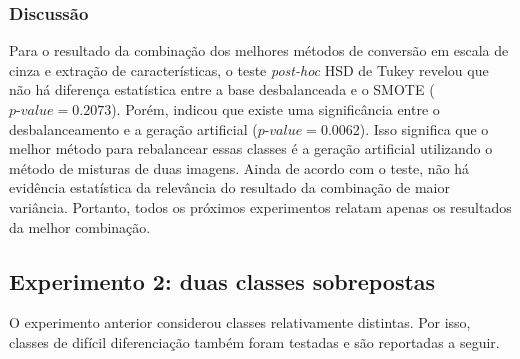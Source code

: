 \FloatBarrier
\subsubsection{Discussão}


Para o resultado da combinação dos melhores métodos de conversão em escala de cinza e extração de características, o teste \textit{post-hoc} HSD de Tukey revelou que não há diferença estatística entre a base desbalanceada e o SMOTE ($\textit{p-value} = 0.2073$). Porém, indicou que existe uma significância entre o desbalanceamento e a geração artificial ($\textit{p-value} = 0.0062$). Isso significa que o melhor método para rebalancear essas classes é a geração artificial utilizando o método de misturas de duas imagens. Ainda de acordo com o teste, não há evidência estatística da relevância do resultado da combinação de maior variância. Portanto, todos os próximos experimentos relatam apenas os resultados da melhor combinação.

\subsection{Experimento 2: duas classes sobrepostas}

O experimento anterior considerou classes relativamente distintas. Por isso, classes de difícil diferenciação também foram testadas e são reportadas a seguir.


